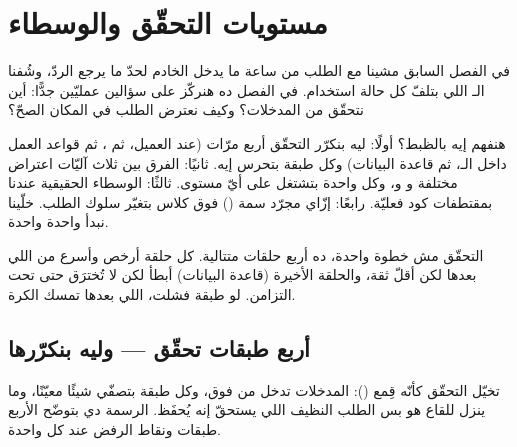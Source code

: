 \section{مستويات التحقّق والوسطاء}

في الفصل السابق مشينا مع الطلب من ساعة ما يدخل الخادم لحدّ ما يرجع الردّ، وشُفنا الـ اللي بتلفّ كل حالة استخدام. في الفصل ده هنركّز على سؤالين عمليّين جدًّا: أين نتحقّق من المدخلات؟ وكيف نعترض الطلب في المكان الصحّ؟

هنفهم إيه بالظبط؟ أولًا: ليه بنكرّر التحقّق أربع مرّات (عند العميل، ثم ، ثم قواعد العمل داخل الـ، ثم قاعدة البيانات) وكل طبقة بتحرس إيه. ثانيًا: الفرق بين ثلاث آليّات اعتراض مختلفة  و و، وكل واحدة بتشتغل على أيّ مستوى. ثالثًا: الوسطاء الحقيقية عندنا بمقتطفات كود فعليّة. رابعًا: إزّاي مجرّد سمة () فوق كلاس بتغيّر سلوك الطلب. خلّينا نبدأ واحدة واحدة.

\begin{idea}
التحقّق مش خطوة واحدة، ده أربع حلقات متتالية. كل حلقة أرخص وأسرع من اللي بعدها لكن أقلّ ثقة، والحلقة الأخيرة (قاعدة البيانات) أبطأ لكن لا تُخترَق حتى تحت التزامن. لو طبقة فشلت، اللي بعدها تمسك الكرة.
\end{idea}

\subsection{أربع طبقات تحقّق — وليه بنكرّرها}

تخيّل التحقّق كأنّه قِمع (): المدخلات تدخل من فوق، وكل طبقة بتصفّي شيئًا معيّنًا، وما ينزل للقاع هو بس الطلب النظيف اللي يستحقّ إنه يُحفَظ. الرسمة دي بتوضّح الأربع طبقات ونقاط الرفض عند كل واحدة.

\begin{center}\begin{LTR}
\end{LTR}\end{center}

